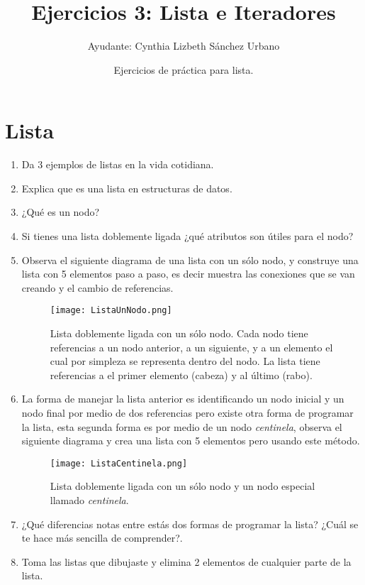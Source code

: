 \documentclass[12pt]{article} %
\begin{document}
\title{Ejercicios 3: Lista e Iteradores}
\author{Ayudante: Cynthia Lizbeth Sánchez Urbano}
\date{Ejercicios de práctica para lista.}
\maketitle
\section{Lista}
\begin{enumerate}
\item Da 3 ejemplos de listas en la vida cotidiana.
\item Explica que es una lista en estructuras de datos.
\item ¿Qué es un nodo?
\item Si tienes una lista doblemente ligada ¿qué atributos son útiles para el nodo?
\item Observa el siguiente diagrama de una lista con un sólo nodo, y construye una lista con 5 elementos paso a paso, es decir muestra las conexiones que se van creando y el cambio de referencias.
\begin{figure}[H]
\centering
\texttt{[image: ListaUnNodo.png]}
\caption{Lista doblemente ligada con un sólo nodo. Cada nodo tiene referencias a un nodo anterior, a un siguiente, y a un elemento el cual por simpleza se representa dentro del nodo. La lista tiene referencias a el primer elemento (cabeza) y al último (rabo).}
\end{figure}
\item La forma de manejar la lista anterior es identificando un nodo inicial y un nodo final por medio de dos referencias pero existe otra forma de programar la lista, esta segunda forma es por medio de un nodo \textit{centinela}, observa el siguiente diagrama y crea una lista con 5 elementos pero usando este método.
\begin{figure}[H]
\centering
\texttt{[image: ListaCentinela.png]}
\caption{Lista doblemente ligada con un sólo nodo y un nodo especial llamado \textit{centinela}.}
\end{figure}
\item ¿Qué diferencias notas entre estás dos formas de programar la lista? ¿Cuál se te hace más sencilla de comprender?.
\item Toma las listas que dibujaste y elimina 2 elementos de cualquier parte de la lista.
\end{enumerate}
\end{document}
